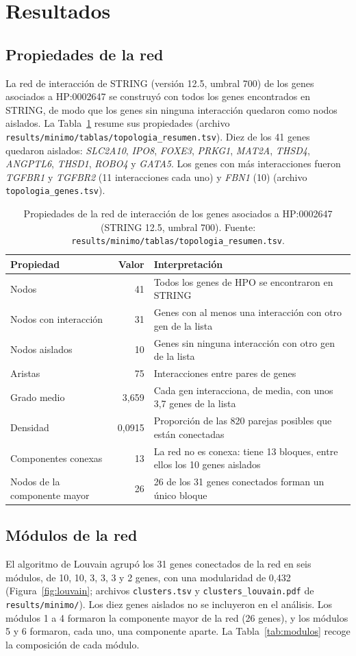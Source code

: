 \section{Resultados}

\subsection{Propiedades de la red}
La red de interacción de STRING (versión 12.5, umbral 700) de los genes asociados a HP:0002647 se construyó con todos los genes encontrados en STRING, de modo que los genes sin ninguna interacción quedaron como nodos aislados. La Tabla~\ref{tab:red} resume sus propiedades (archivo \texttt{results/minimo/tablas/topologia\_resumen.tsv}). Diez de los 41 genes quedaron aislados: \textit{SLC2A10}, \textit{IPO8}, \textit{FOXE3}, \textit{PRKG1}, \textit{MAT2A}, \textit{THSD4}, \textit{ANGPTL6}, \textit{THSD1}, \textit{ROBO4} y \textit{GATA5}. Los genes con más interacciones fueron \textit{TGFBR1} y \textit{TGFBR2} (11 interacciones cada uno) y \textit{FBN1} (10) (archivo \texttt{topologia\_genes.tsv}).

\begin{table}[h!]
	\renewcommand{\arraystretch}{1.25}
	\caption{Propiedades de la red de interacción de los genes asociados a HP:0002647 (STRING 12.5, umbral 700). Fuente: \texttt{results/minimo/tablas/topologia\_resumen.tsv}.}
	\label{tab:red}
	\begin{tabular}{lrp{6.3cm}}
		\hline
		Propiedad & Valor & Interpretación \tabularnewline
		\hline
		Nodos & 41 & Todos los genes de HPO se encontraron en STRING \tabularnewline
		Nodos con interacción & 31 & Genes con al menos una interacción con otro gen de la lista \tabularnewline
		Nodos aislados & 10 & Genes sin ninguna interacción con otro gen de la lista \tabularnewline
		Aristas & 75 & Interacciones entre pares de genes \tabularnewline
		Grado medio & 3,659 & Cada gen interacciona, de media, con unos 3,7 genes de la lista \tabularnewline
		Densidad & 0,0915 & Proporción de las 820 parejas posibles que están conectadas \tabularnewline
		Componentes conexas & 13 & La red no es conexa: tiene 13 bloques, entre ellos los 10 genes aislados \tabularnewline
		Nodos de la componente mayor & 26 & 26 de los 31 genes conectados forman un único bloque \tabularnewline
		\hline
	\end{tabular}
\end{table}

\subsection{Módulos de la red}
El algoritmo de Louvain agrupó los 31 genes conectados de la red en seis módulos, de 10, 10, 3, 3, 3 y 2 genes, con una modularidad de 0,432 (Figura~\ref{fig:louvain}; archivos \texttt{clusters.tsv} y \texttt{clusters\_louvain.pdf} de \texttt{results/minimo/}). Los diez genes aislados no se incluyeron en el análisis. Los módulos 1 a 4 formaron la componente mayor de la red (26 genes), y los módulos 5 y 6 formaron, cada uno, una componente aparte. La Tabla~\ref{tab:modulos} recoge la composición de cada módulo.

